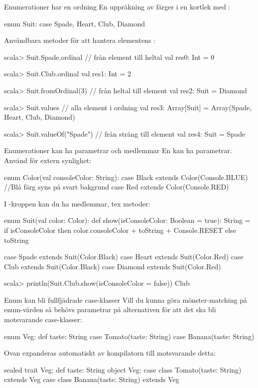

\SlideFontSmall
\begin{Slide}{Enumerationer har en ordning}
En uppräkning av färger i en kortlek med :
\begin{Code}
enum Suit:
  case Spade, Heart, Club, Diamond 
\end{Code}
Användbara metoder för att hantera elementens :
\begin{REPLsmall}
scala> Suit.Spade.ordinal      // från element till heltal
val res0: Int = 0

scala> Suit.Club.ordinal
val res1: Int = 2

scala> Suit.fromOrdinal(3)    // från heltal till element
val res2: Suit = Diamond

scala> Suit.values            // alla element i ordning
val res3: Array[Suit] = Array(Spade, Heart, Club, Diamond)

scala> Suit.valueOf("Spade")  // från sträng till element
val res4: Suit = Spade
\end{REPLsmall}
\end{Slide}

\begin{Slide}{Enumerationer kan ha parametrar och medlemmar}
En  kan ha parametrar. Använd  för extern synlighet:  
\begin{Code}
enum Color(val consoleColor: String): 
  case Black extends Color(Console.BLUE) //Blå färg syns på svart bakgrund
  case Red   extends Color(Console.RED)
\end{Code}
I -kroppen kan du ha medlemmar, tex metoder:
\begin{Code}
enum Suit(val color: Color):
  def show(isConsoleColor: Boolean = true): String = 
    if isConsoleColor then color.consoleColor + toString + Console.RESET
    else toString

  case Spade   extends Suit(Color.Black)
  case Heart   extends Suit(Color.Red)
  case Club    extends Suit(Color.Black) 
  case Diamond extends Suit(Color.Red)
\end{Code}
\begin{REPLsmall}
scala> println(Suit.Club.show(isConsoleColor = false)) 
Club
\end{REPLsmall}
\end{Slide}

\begin{Slide}{Enum kan bli fullfjädrade case-klasser}
Vill du kunna göra mönster-matching på enum-värden så behövs parametrar på alternativen för att det ska bli motsvarande case-klasser: 
\begin{Code}
enum Veg:
  def taste: String
  case Tomato(taste: String)
  case Banana(taste: String)
\end{Code}
Ovan expanderas automatiskt av kompilatorn till motsvarande detta:
\begin{Code}
sealed trait Veg:
  def taste: String
object Veg:
  case class Tomato(taste: String) extends Veg
  case class Banana(taste: String) extends Veg
\end{Code}
\end{Slide}


